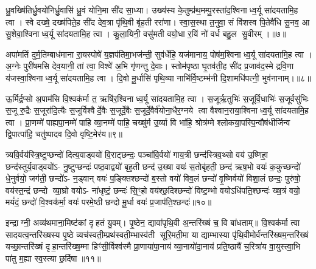{\anuvakamend[{विट्प॑ष्ठ॒वाड्वयो॒ऽष्टाविꣳ॑शतिश्च॥३॥}]}

ध्रु॒वख्षि॑तिर्ध्रु॒वयो॑निर्ध्रु॒वासि॑ ध्रु॒वं योनि॒मा सी॑द सा॒ध्या। उख्य॑स्य के॒तुम्प्र॑थ॒मम्पु॒रस्ता॑द॒श्विनाध्व॒र्यू सा॑दयतामि॒ह त्वा। स्वे दख्षे॒ दख्ष॑पिते॒ह सी॑द देव॒त्रा पृ॑थि॒वी बृ॑ह॒ती ररा॑णा। स्वा॒स॒स्था त॒नुवा॒ सं वि॑शस्व पि॒तेवै॑धि सू॒नव॒ आ सु॒शेवा॒श्विनाध्व॒र्यू सा॑दयतामि॒ह त्वा। कु॒ला॒यिनी॒ वसु॑मती वयो॒धा र॒यिं नो॑ वर्ध बहु॒ल सु॒वीरम्।॥७॥

अपा॑मतिं दुर्म॒तिम्बाध॑माना रा॒यस्पोषे॑ य॒ज्ञप॑तिमा॒भज॑न्ती॒ सुव॑र्धेहि॒ यज॑मानाय॒ पोष॑म॒श्विनाध्व॒र्यू सा॑दयतामि॒ह त्वा। अ॒ग्नेः पुरी॑षमसि देव॒यानी॒ तां त्वा॒ विश्वे॑ अ॒भि गृ॑णन्तु दे॒वाः। स्तोम॑पृष्ठा घृ॒तव॑ती॒ह सी॑द प्र॒जाव॑द॒स्मे द्रवि॒णा य॑जस्वा॒श्विनाध्व॒र्यू सा॑दयतामि॒ह त्वा। दि॒वो मू॒र्धासि॑ पृथि॒व्या नाभि॑र्वि॒ष्टम्भ॑नी दि॒शामधि॑पत्नी॒ भुव॑नानाम्।॥८॥

ऊ॒र्मिर्द्र॒प्सो अ॒पाम॑सि वि॒श्वक॑र्मा त॒ ऋषि॑र॒श्विनाध्व॒र्यू सा॑दयतामि॒ह त्वा। स॒जूर्\mbox{}ऋ॒तुभिः॑ स॒जूर्वि॒धाभिः॑ स॒जूर्वसु॑भिः स॒जू रु॒द्रैः स॒जूरा॑दि॒त्यैः स॒जूर्विश्वैर्दे॒वैः स॒जूर्दे॒वैः स॒जूर्दे॒वैर्व॑योना॒धैर॒ग्नये त्वा वैश्वान॒राया॒श्विनाध्व॒र्यू सा॑दयतामि॒ह त्वा। प्रा॒णम्मे॑ पाह्यपा॒नम्मे॑ पाहि व्या॒नम्मे॑ पाहि॒ चख्षु॑र्म उ॒र्व्या वि भा॑हि॒ श्रोत्र॑म्मे श्लोकया॒पस्पि॒न्वौष॑धीर्जिन्व द्वि॒पात्पा॑हि॒ चतु॑ष्पादव दि॒वो वृष्टि॒मेर॑य॥९॥

{\anuvakamend[{सु॒वीरं॒ भुव॑नानामु॒र्व्या स॒प्तद॑श च॥४॥}]}

त्र्यवि॒र्वय॑स्त्रि॒ष्टुप्छन्दो॑ दित्य॒वाड्वयो॑ वि॒राट्छन्दः॒ पञ्चा॑वि॒र्वयो॑ गाय॒त्री छन्द॑स्त्रिव॒थ्सो वय॑ उ॒ष्णिहा॒ छन्द॑स्तुर्य॒वाड्वयो॑ऽ- नु॒ष्टुप्छन्दः॑ पष्ठ॒वाद्वयो॑ बृह॒ती छन्द॑ उ॒ख्षा वयः॑ स॒तोबृ॑हती॒ छन्द॑ ऋष॒भो वयः॑ क॒कुच्छन्दो॑ धे॒नुर्वयो॒ जग॑ती॒ छन्दो॑ऽ- न॒ड्वान् वयः॑ प॒ङ्क्तिश्छन्दो॑ ब॒स्तो वयो॑ विव॒लं छन्दो॑ वृ॒ष्णिर्वयो॑ विशा॒लं छन्दः॒ पुरु॑षो॒ वय॑स्त॒न्द्रं छन्दो व्या॒घ्रो वयोऽ- ना॑धृष्टं॒ छन्दः॑ सि॒ꣳ॒हो वय॑श्छ॒दिश्छन्दो॑ विष्ट॒म्भो वयोऽधि॑पति॒श्छन्दः॑ ख्ष॒त्रं वयो॒ मयं॑दं॒ छन्दो॑ वि॒श्वक॑र्मा॒ वयः॑ परमे॒ष्ठी छन्दो मू॒र्धा वयः॑ प्र॒जाप॑ति॒श्छन्दः॑॥१०॥

{\anuvakamend[{पुरु॑षो॒ वय॒ष्षड्विꣳ॑शतिश्च॥५॥}]}

इन्द्राग्नी॒ अव्य॑थमाना॒मिष्ट॑कां दृहतं यु॒वम्। पृ॒ष्ठेन॒ द्यावा॑पृथि॒वी अ॒न्तरि॑ख्षं च॒ वि बा॑धताम्॥ वि॒श्वक॑र्मा त्वा सादयत्व॒न्तरि॑ख्षस्य पृ॒ष्ठे व्यच॑स्वती॒म्प्रथ॑स्वती॒म्भास्व॑ती सूरि॒मती॒मा या द्याम्भास्या पृ॑थि॒वीमोर्व॑न्तरि॑ख्षम॒न्तरि॑ख्षं यच्छा॒न्तरि॑ख्षं दृहा॒न्तरि॑ख्ष॒म्मा हिꣳ॑सी॒र्विश्व॑स्मै प्रा॒णाया॑पा॒नाय॑ व्या॒नायो॑दा॒नाय॑ प्रति॒ष्ठायै॑ च॒रित्रा॑य वा॒युस्त्वा॒भि पा॑तु म॒ह्या स्व॒स्त्या छ॒र्दिषा॥११॥

